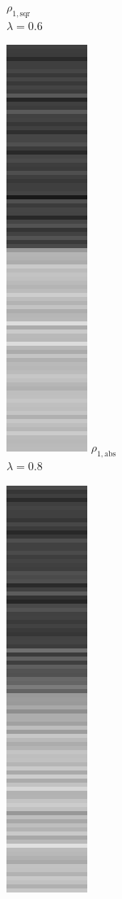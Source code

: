 \documentclass[onecolumn,final,a4paper,13pt,reqno]{siamart}
\begin{document}
\begin{figure}[t]
\begin{subfigure}[t]{0.08\textwidth}
		\scriptsize $\rho_{1,\text{sqr}}$\\[2px]
		\scriptsize $\lambda = 0.6$
	\end{subfigure}
	\begin{subfigure}[t]{0.08\textwidth}
		\includegraphics[scale=0.3]{pictures/denoising/signal/ipiano_absolute_08.png}
		\scriptsize $\rho_{1,\text{abs}}$\\[2px]
		\scriptsize $\lambda = 0.8$
	\end{subfigure}
	\begin{subfigure}[t]{0.08\textwidth}
		\includegraphics[scale=0.3]{pictures/denoising/signal/ipiano_squared_08.png}

\end{subfigure}
\end{figure}
\end{document}
